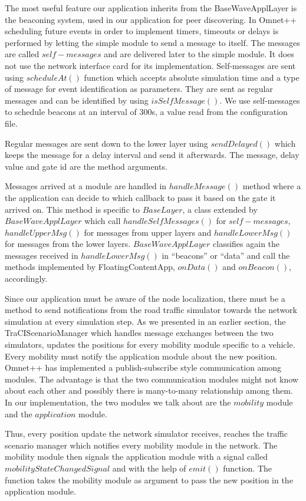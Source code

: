 The most useful feature our application inherits from the BaseWaveApplLayer is
the beaconing system, used in our application for peer discovering. In Omnet++
scheduling future events in order to implement timers, timeouts or delays is
performed by letting the simple module to send a message to itself. The messages
are called $self-messages$ and are delivered later to the simple module. It does
not use the network interface card for its implementation. Self-messages are
sent using $scheduleAt()$ function which accepts absolute simulation time and a
type of message for event identification as parameters. They are sent as regular
messages and can be identified by using $isSelfMessage()$. We use self-messages
to schedule beacons at an interval of 300s, a value read from the configuration
file.

Regular messages are sent down to the lower layer using $sendDelayed()$ which
keeps the message for a delay interval and send it afterwards. The message,
delay value and gate id are the method arguments.

Messages arrived at a module are handled in $handleMessage()$ method where a the
application can decide to which callback to pass it based on the gate it arrived
on. This method is specific to $BaseLayer$, a class extended by
$BaseWaveApplLayer$ which call $handleSelfMessages()$ for $self-messages$,
$handleUpperMsg()$ for messages from upper layers and $handleLowerMsg()$ for
messages from the lower layers. $BaseWaveApplLayer$ classifies again the
messages received in $handleLowerMsg()$ in ``beacons'' or ``data'' and call the
methods implemented by FloatingContentApp, $onData()$ and $onBeacon()$, accordingly.

Since our application must be aware of the node localization, there must be a
method to send notifications from the road traffic simulator towards the network
simulation at every simulation step. As we presented in an earlier section, the
TraCIScenarioManager which handles message exchanges between the two simulators,
updates the positions for every mobility module specific to a vehicle. Every
mobility must notify the application module about the new position. Omnet++ has
implemented a publish-subscribe style communication among modules. The advantage
is that the two communication modules might not know about each other and
possibly there is many-to-many relationship among them. In our implementation,
the two modules we talk about are the $mobility$ module and the $application$
module.

Thus, every position update the network simulator receives, reaches the
traffic scenario manager which notifies every mobility module in the network.
The mobility module then signals the application module with a signal called
$mobilityStateChangedSignal$ and with the help of $emit()$ function. The function
takes the mobility module as argument to pass the new position in the
application module.


